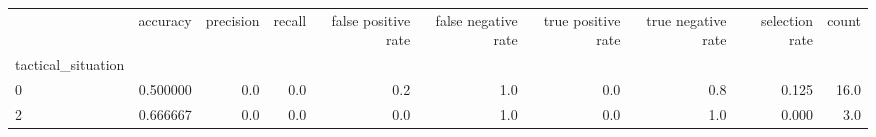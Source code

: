 \begin{tabular}{lrrrrrrrrr}
\toprule
{} &  accuracy &  precision &  recall &  false positive rate &  false negative rate &  true positive rate &  true negative rate &  selection rate &  count \\
tactical\_situation &           &            &         &                      &                      &                     &                     &                 &        \\
\midrule
0                  &  0.500000 &        0.0 &     0.0 &                  0.2 &                  1.0 &                 0.0 &                 0.8 &           0.125 &   16.0 \\
2                  &  0.666667 &        0.0 &     0.0 &                  0.0 &                  1.0 &                 0.0 &                 1.0 &           0.000 &    3.0 \\
\bottomrule
\end{tabular}
